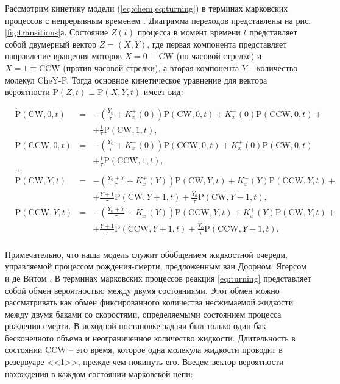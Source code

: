 Рассмотрим кинетику модели (\cref{eq:chem,eq:turning}) в терминах марковских процессов с непрерывным временем \cite{}. Диаграмма переходов представлены на рис. \cref{fig:transitions}а. Состояние $Z(t)$ процесса в момент времени $t$ представляет собой двумерный вектор $Z = (X, Y)$, где первая компонента представляет направление вращения моторов $X = 0 \equiv \mathrm{CW}$ (по часовой стрелке) и $X = 1 \equiv \mathrm{CCW}$ (против часовой стрелки), а вторая компонента $Y$ -- количество молекул CheY-P. Тогда основное кинетическое уравнение для вектора вероятности $\mathrm{P}(Z, t) \equiv \mathrm{P}(X, Y, t)$ имеет вид:

\begin{equation}
    \begin{aligned}
        &\dot{\mathrm{P}}(\mathrm{CW},0,t)&=&-\left (\frac{Y_0}{\tau} + K_x^+(0) \right ) \mathrm{P}(\mathrm{CW},0,t) + K_x^-(0) \mathrm{P}(\mathrm{CCW},0,t)+&&\\
        &&&+\frac{1}{\tau}\mathrm{P}(\mathrm{CW},1,t),&&\\
        &\dot{\mathrm{P}}(\mathrm{CCW},0,t)&=&-\left (\frac{Y_0}{\tau} + K_x^-(0) \right ) \mathrm{P}(\mathrm{CCW},0,t) + K_x^+(0) \mathrm{P}(\mathrm{CW},0,t)&&\\
        &&&+\frac{1}{\tau}\mathrm{P}(\mathrm{CCW},1,t),&&\\
        &\dots&&\\
        &\dot{\mathrm{P}}(\mathrm{CW},Y,t)&=&-\left (\frac{Y_0+Y}{\tau} + K_x^+(Y) \right ) \mathrm{P}(\mathrm{CW},Y,t) + K_x^-(Y) \mathrm{P}(\mathrm{CCW},Y,t)+&&\\
        &&&+\frac{Y+1}{\tau}\mathrm{P}(\mathrm{CW},Y+1,t)+\frac{Y_0}{\tau}\mathrm{P}(\mathrm{CW},Y-1,t),&&\\
        &\dot{\mathrm{P}}(\mathrm{CCW},Y,t)&=&-\left (\frac{Y_0+Y}{\tau} + K_x^-(Y) \right ) \mathrm{P}(\mathrm{CCW},Y,t) + K_x^+(Y) \mathrm{P}(\mathrm{CW},Y,t)+&&\\
        &&&+\frac{Y+1}{\tau}\mathrm{P}(\mathrm{CCW},Y+1,t)+\frac{Y_0}{\tau}\mathrm{P}(\mathrm{CCW},Y-1,t),&&\\
    \end{aligned}
    \label{eq:master-transitions}
\end{equation}

Примечательно, что наша модель служит обобщением жидкостной очереди, управляемой процессом рождения-смерти, предложенным ван Доорном, Ягерсом и де Витом \cite{}. В терминах марковских процессов реакция \cref{eq:turning} представляет собой обмен вероятностью между двумя состояниями. Этот обмен можно рассматривать как обмен фиксированного количества несжимаемой жидкости между двумя баками со скоростями, определяемыми состоянием процесса рождения-смерти. В исходной постановке задачи был только один бак бесконечного объема и неограниченное количество жидкости. Длительность в состоянии CCW -- это время, которое одна молекула жидкости проводит в резервуаре <<1>>, прежде чем покинуть его. Введем вектор вероятности нахождения в каждом состоянии марковской цепи: 

